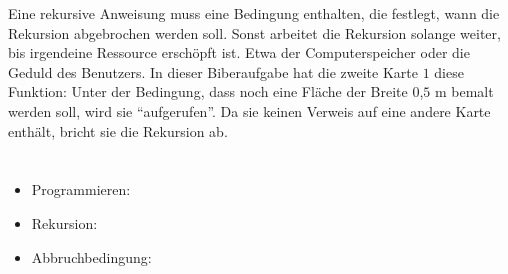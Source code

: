 {{Eine rekursive Anweisung muss eine Bedingung enthalten, die festlegt, wann die Rekursion abgebrochen werden soll. Sonst arbeitet die Rekursion solange weiter, bis irgendeine Ressource erschöpft ist. Etwa der Computerspeicher oder die Geduld des Benutzers.  In dieser Biberaufgabe hat die zweite Karte $1$ diese Funktion:  Unter der Bedingung, dass noch eine Fläche der Breite $0$,$5$ m bemalt werden soll, wird sie \enquote{aufgerufen}.  Da sie keinen Verweis auf eine andere Karte enthält, bricht sie die Rekursion ab.



\section*{\BrochureWebsitesAndKeywords}
{\raggedright
\begin{itemize}
  \item Programmieren: \href{https://de.wikipedia.org/wiki/Programmierung}{}
  \item Rekursion: \href{https://de.wikipedia.org/wiki/Rekursion}{}
  \item Abbruchbedingung: \href{https://de.wikipedia.org/wiki/Abbruchbedingung}{}
\end{itemize}


}

}{}

\def\AuthorFutschekG{} %
\def\AuthorBaumannW{} %
\def\AuthorWeigendM{} %
\def\AuthorPohlW{} %
\def\AuthorHeinH{} %
\def\AuthorDatzkoThutS{} %
\def\AuthorDagieneV{} %
\def\AuthorAkhmetovN{} %
\def\AuthorSchrijversE{} %
\def\AuthorMorpurgoA{} %
\def\AuthorRoffeyC{} %

\newpage}{}
